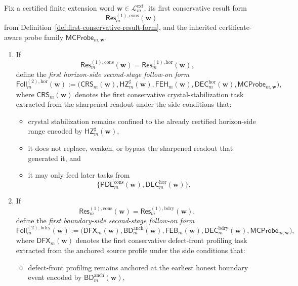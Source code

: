 \begin{definition}
\label{def:first-second-stage-follow-on-form}
Fix a certified finite extension word \(\mathbf w\in\mathcal L^{\mathrm{ext}}_{m}\), its first conservative result form
\[
 \mathsf{Res}^{(1),\mathrm{cons}}_{m}(\mathbf w)
\]
from Definition~\ref{def:first-conservative-result-form}, and the inherited certificate-aware probe family \(\mathsf{MCProbe}_{m,\mathbf w}\).
\begin{enumerate}[label=(\roman*)]
 \item If
 \[
 \mathsf{Res}^{(1),\mathrm{cons}}_{m}(\mathbf w)=\mathsf{Res}^{(1),\mathrm{hor}}_{m}(\mathbf w),
 \]
 define the \emph{first horizon-side second-stage follow-on form}
 \[
 \mathsf{Foll}^{(2),\mathrm{hor}}_{m}(\mathbf w)
 :=
 \bigl(\mathsf{CRS}_{m}(\mathbf w),\mathsf{HZ}^{\sharp}_{m}(\mathbf w),\mathsf{FEH}_{m}(\mathbf w),\mathsf{DEC}^{\mathrm{hor}}_{m}(\mathbf w),\mathsf{MCProbe}_{m,\mathbf w}\bigr),
 \]
 where \(\mathsf{CRS}_{m}(\mathbf w)\) denotes the first conservative crystal-stabilization task extracted from the sharpened readout under the side conditions that:
 \begin{itemize}[leftmargin=2em]
 \item crystal stabilization remains confined to the already certified horizon-side range encoded by \(\mathsf{HZ}^{\sharp}_{m}(\mathbf w)\),
 \item it does not replace, weaken, or bypass the sharpened readout that generated it, and
 \item it may only feed later tasks from
 \[
 \{\mathsf{PDE}^{\mathrm{cons}}_{m}(\mathbf w),\mathsf{DEC}^{\mathrm{hor}}_{m}(\mathbf w)\}.
 \]
 \end{itemize}
 \item If
 \[
 \mathsf{Res}^{(1),\mathrm{cons}}_{m}(\mathbf w)=\mathsf{Res}^{(1),\mathrm{bdry}}_{m}(\mathbf w),
 \]
 define the \emph{first boundary-side second-stage follow-on form}
 \[
 \mathsf{Foll}^{(2),\mathrm{bdry}}_{m}(\mathbf w)
 :=
 \bigl(\mathsf{DFX}_{m}(\mathbf w),\mathsf{BD}^{\mathrm{anch}}_{m}(\mathbf w),\mathsf{FEB}_{m}(\mathbf w),\mathsf{DEC}^{\mathrm{bdry}}_{m}(\mathbf w),\mathsf{MCProbe}_{m,\mathbf w}\bigr),
 \]
 where \(\mathsf{DFX}_{m}(\mathbf w)\) denotes the first conservative defect-front profiling task extracted from the anchored source profile under the side conditions that:
 \begin{itemize}[leftmargin=2em]
 \item defect-front profiling remains anchored at the earliest honest boundary event encoded by \(\mathsf{BD}^{\mathrm{anch}}_{m}(\mathbf w)\),

\end{itemize}
\end{enumerate}
\end{definition}
